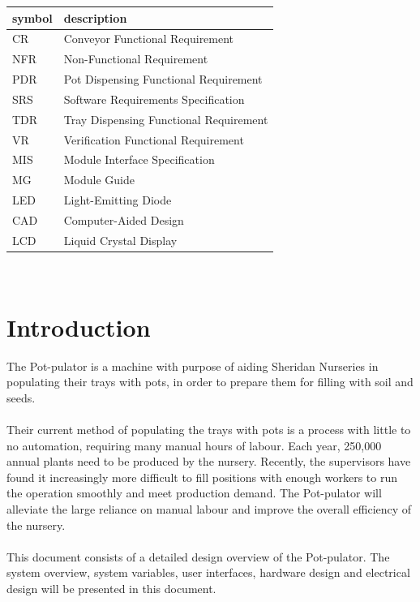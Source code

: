 \documentclass[12pt, titlepage]{article}
\begin{document}
\renewcommand{\arraystretch}{1.2}
\begin{tabular}{l l} 
  \toprule		
  \textbf{symbol} & \textbf{description}\\
  \midrule 
  CR & Conveyor Functional Requirement\\
  NFR & Non-Functional Requirement\\
  PDR & Pot Dispensing Functional Requirement\\
  SRS & Software Requirements Specification\\
  TDR & Tray Dispensing Functional Requirement\\
  VR & Verification Functional Requirement\\
  MIS & Module Interface Specification \\
  MG & Module Guide \\
  LED & Light-Emitting Diode\\
  CAD & Computer-Aided Design\\
  LCD & Liquid Crystal Display\\
  \bottomrule
\end{tabular}\\

\newpage

\tableofcontents

\newpage

\listoftables

\listoffigures

\newpage


\section{Introduction}

The Pot-pulator is a machine with purpose of aiding Sheridan Nurseries in 
populating their trays with pots, in order to prepare them for filling with 
soil and seeds.\\\\Their current method of populating the trays with pots is a 
process with little to no automation, requiring many manual hours of labour. 
Each year, 250,000 annual plants need to be produced by the nursery. Recently, 
the supervisors have found it increasingly more difficult to fill positions with 
enough workers to run the operation smoothly and meet production demand. 
The Pot-pulator will alleviate the large reliance on manual labour and 
improve the overall efficiency of the nursery. \\\\This document consists of a 
detailed design overview of the Pot-pulator. The system overview, system 
variables, user interfaces, hardware design and electrical design will be 
presented in this document.
\end{document}
